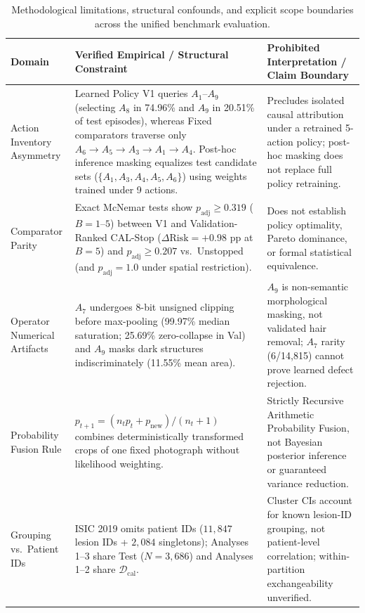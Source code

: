 \begin{table}[!htbp]
\centering
\caption{Methodological limitations, structural confounds, and explicit scope boundaries across the unified benchmark evaluation.}
\label{tab:limitations_claim_boundaries}
\scriptsize
\setlength{\tabcolsep}{4pt}
\begin{tabular}{@{}p{3.0cm}p{5.5cm}p{5.5cm}@{}}
\toprule
Domain & Verified Empirical / Structural Constraint & Prohibited Interpretation / Claim Boundary \\
\midrule
Action Inventory Asymmetry & Learned Policy V1 queries $A_1$--$A_9$ (selecting $A_8$ in 74.96\% and $A_9$ in 20.51\% of test episodes), whereas Fixed comparators traverse only $A_6 \to A_5 \to A_3 \to A_1 \to A_4$. Post-hoc inference masking equalizes test candidate sets ($\{A_1,A_3,A_4,A_5,A_6\}$) using weights trained under 9 actions. & Precludes isolated causal attribution under a retrained 5-action policy; post-hoc masking does not replace full policy retraining. \\
\midrule
Comparator Parity & Exact McNemar tests show $p_{\mathrm{adj}} \ge 0.319$ ($B=1$--$5$) between V1 and Validation-Ranked CAL-Stop ($\Delta \mathrm{Risk} = +0.98$ pp at $B=5$) and $p_{\mathrm{adj}} \ge 0.207$ vs.\ Unstopped (and $p_{\mathrm{adj}}=1.0$ under spatial restriction). & Does not establish policy optimality, Pareto dominance, or formal statistical equivalence. \\
\midrule
Operator Numerical Artifacts & $A_7$ undergoes 8-bit unsigned clipping before max-pooling (99.97\% median saturation; 25.69\% zero-collapse in Val) and $A_9$ masks dark structures indiscriminately (11.55\% mean area). & $A_9$ is non-semantic morphological masking, not validated hair removal; $A_7$ rarity (6/14,815) cannot prove learned defect rejection. \\
\midrule
Probability Fusion Rule & $p_{t+1} = (n_t p_t + p_{\mathrm{new}})/(n_t+1)$ combines deterministically transformed crops of one fixed photograph without likelihood weighting. & Strictly Recursive Arithmetic Probability Fusion, not Bayesian posterior inference or guaranteed variance reduction. \\
\midrule
Grouping vs.\ Patient IDs & ISIC 2019 omits patient IDs ($11{,}847$ lesion IDs + $2{,}084$ singletons); Analyses 1--3 share Test ($N=3{,}686$) and Analyses 1--2 share $\mathcal{D}_{\mathrm{cal}}$. & Cluster CIs account for known lesion-ID grouping, not patient-level correlation; within-partition exchangeability unverified. \\
\midrule

\end{tabular}
\end{table}
